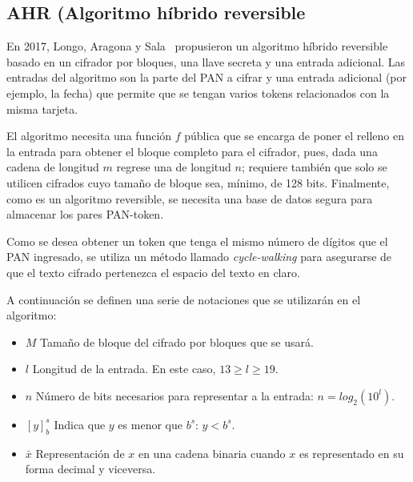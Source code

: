 %
%

\subsection{AHR (Algoritmo híbrido reversible}
En 2017, Longo, Aragona y Sala~\cite{aragona} propusieron un algoritmo híbrido
reversible basado en un cifrador por bloques, una llave secreta y una entrada
adicional. Las entradas del algoritmo son la parte del PAN a cifrar y una
entrada adicional (por ejemplo, la fecha) que permite que se tengan varios
tokens relacionados con la misma tarjeta.

El algoritmo necesita una función $ f $ pública que se encarga de poner el relleno
en la entrada para obtener el bloque completo para el cifrador, pues, dada una
cadena de longitud $ m $ regrese una de longitud $ n $; requiere también que
solo se utilicen cifrados cuyo tamaño de bloque sea, mínimo, de 128 bits.
Finalmente, como es un algoritmo reversible, se necesita una base de datos
segura para almacenar los pares PAN-token.

Como se desea obtener un token que tenga el mismo número de dígitos que el PAN
ingresado, se utiliza un método llamado \textit{cycle-walking} para asegurarse
de que el texto cifrado pertenezca el espacio del texto en claro.

A continuación se definen una serie de notaciones que se utilizarán en el
algoritmo:
\begin{itemize}
  \item $ M $ Tamaño de bloque del cifrado por bloques que se usará.
  \item $ l $ Longitud de la entrada. En este caso, $13 \geq l \geq 19$.
  \item $ n $ Número de bits necesarios para representar a la entrada:
    $n = log_2(10^l)$.
  \item $ [y]^s_b $ Indica que $y$ es menor que $b^s$: $y < b^s$.
  \item $\bar{x}$ Representación de $x$ en una cadena binaria cuando $x$ es
    representado en su forma decimal y viceversa.
\end{itemize}

